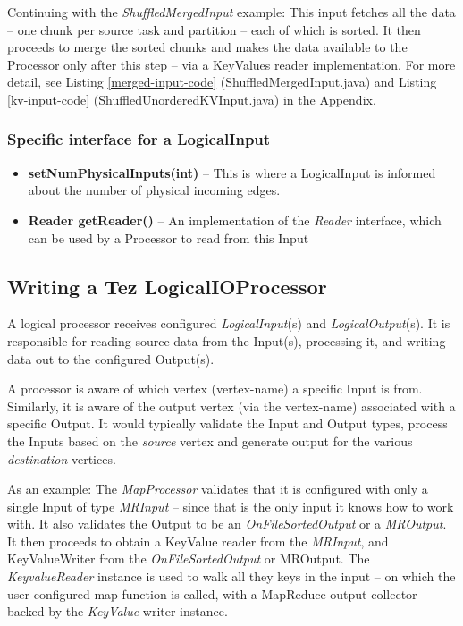 \documentclass[twocolumn]{article}
\newcommand{\bi}{\begin{itemize}}
\newcommand{\ei}{\end{itemize}}
\newcommand{\ii}{\item}
\begin{document}
Continuing with the \textit{ShuffledMergedInput} example: This input fetches all
the data -- one chunk per source task and partition -- each of which is
sorted. It then proceeds to merge the sorted chunks and makes the data
available to the Processor only after this step -- via a KeyValues
reader implementation.
For more detail, see Listing \ref{merged-input-code} (ShuffledMergedInput.java) and Listing \ref{kv-input-code} (ShuffledUnorderedKVInput.java) in the Appendix.

\subsubsection*{Specific interface for a LogicalInput}
\bi
\ii \textbf{setNumPhysicalInputs(int)} -- This is where a LogicalInput is informed
about the number of physical incoming edges. 
\ii \textbf{Reader getReader()} -- An
implementation of the \textit{Reader} interface, which can be used by a Processor
to read from this Input
\ei

\subsection{Writing a Tez LogicalIOProcessor}

A logical processor receives configured \textit{LogicalInput}(s) and
\textit{LogicalOutput}(s). It is responsible for reading source data from the
Input(s), processing it, and writing data out to the configured
Output(s).

A processor is aware of which vertex (vertex-name) a specific Input is
from. Similarly, it is aware of the output vertex (via the vertex-name)
associated with a specific Output. It would typically validate the Input
and Output types, process the Inputs based on the \textit{source} vertex and
generate output for the various \textit{destination} vertices.

As an example: The \textit{MapProcessor} validates that it is configured with
only a single Input of type \textit{MRInput} -- since that is the only input it
knows how to work with. It also validates the Output to be an
\textit{OnFileSortedOutput} or a \textit{MROutput}. It then proceeds to obtain a KeyValue
reader from the \textit{MRInput}, and KeyValueWriter from the \textit{OnFileSortedOutput}
or MROutput. The \textit{KeyvalueReader} instance is used to walk all they keys
in the input -- on which the user configured map function is called,
with a MapReduce output collector backed by the \textit{KeyValue} writer
instance.
\end{document}
